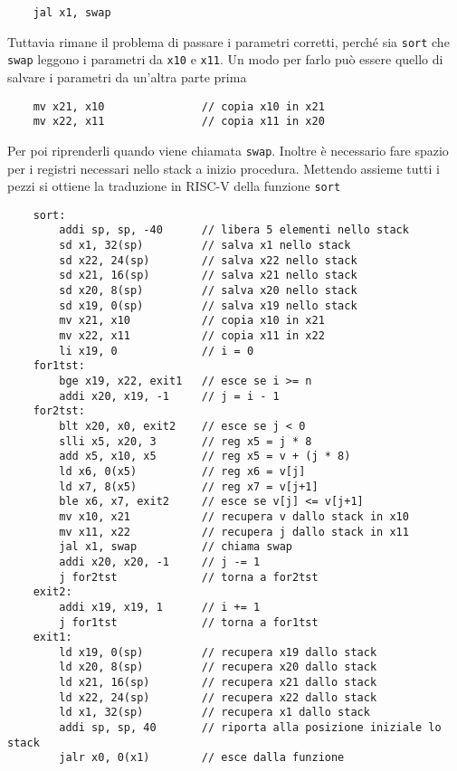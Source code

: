 \documentclass[a4paper,12pt]{article}
\theoremstyle{break}
\newcommand{\code}[1]{\texttt{#1}}
\numberwithin{equation}{section}
\begin{document}
\begin{verbatim}
    jal x1, swap
\end{verbatim}
Tuttavia rimane il problema di passare i parametri corretti, perché sia \code{sort} che \code{swap} leggono i parametri da \code{x10} e \code{x11}. Un modo per farlo può essere quello di salvare i parametri da un'altra parte prima
\begin{verbatim}
    mv x21, x10               // copia x10 in x21
    mv x22, x11               // copia x11 in x20
\end{verbatim}
Per poi riprenderli quando viene chiamata \code{swap}. 
Inoltre è necessario fare spazio per i registri necessari nello stack a inizio procedura.  
Mettendo assieme tutti i pezzi si ottiene la traduzione in RISC-V della funzione \code{sort}
\begin{verbatim}
    sort:
        addi sp, sp, -40      // libera 5 elementi nello stack
        sd x1, 32(sp)         // salva x1 nello stack 
        sd x22, 24(sp)        // salva x22 nello stack        
        sd x21, 16(sp)        // salva x21 nello stack
        sd x20, 8(sp)         // salva x20 nello stack
        sd x19, 0(sp)         // salva x19 nello stack
        mv x21, x10           // copia x10 in x21
        mv x22, x11           // copia x11 in x22 
        li x19, 0             // i = 0
    for1tst:
        bge x19, x22, exit1   // esce se i >= n
        addi x20, x19, -1     // j = i - 1
    for2tst:
        blt x20, x0, exit2    // esce se j < 0
        slli x5, x20, 3       // reg x5 = j * 8
        add x5, x10, x5       // reg x5 = v + (j * 8)
        ld x6, 0(x5)          // reg x6 = v[j]
        ld x7, 8(x5)          // reg x7 = v[j+1]
        ble x6, x7, exit2     // esce se v[j] <= v[j+1]
        mv x10, x21           // recupera v dallo stack in x10
        mv x11, x22           // recupera j dallo stack in x11
        jal x1, swap          // chiama swap
        addi x20, x20, -1     // j -= 1
        j for2tst             // torna a for2tst
    exit2:
        addi x19, x19, 1      // i += 1
        j for1tst             // torna a for1tst
    exit1:
        ld x19, 0(sp)         // recupera x19 dallo stack
        ld x20, 8(sp)         // recupera x20 dallo stack
        ld x21, 16(sp)        // recupera x21 dallo stack
        ld x22, 24(sp)        // recupera x22 dallo stack
        ld x1, 32(sp)         // recupera x1 dallo stack
        addi sp, sp, 40       // riporta alla posizione iniziale lo stack
        jalr x0, 0(x1)        // esce dalla funzione
\end{verbatim}
\end{document}
